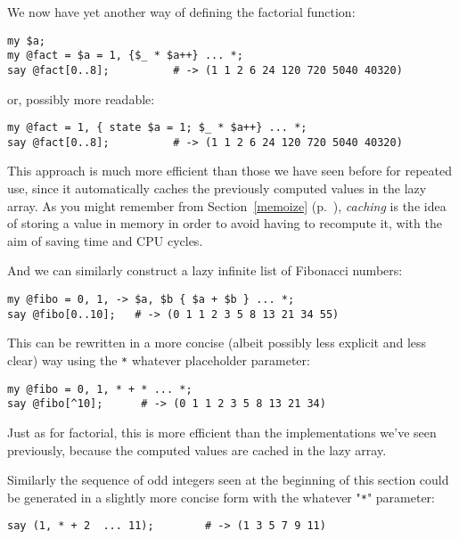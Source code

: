 We now have yet another way of defining the factorial 
function:

\begin{verbatim}
my $a;
my @fact = $a = 1, {$_ * $a++} ... *;
say @fact[0..8];          # -> (1 1 2 6 24 120 720 5040 40320)
\end{verbatim}

or, possibly more readable:

\begin{verbatim}
my @fact = 1, { state $a = 1; $_ * $a++} ... *;
say @fact[0..8];          # -> (1 1 2 6 24 120 720 5040 40320)
\end{verbatim}


This approach is much more efficient than those we have 
seen before for repeated use, since it automatically 
caches the previously computed values in the lazy array. 
As you might remember from Section~\ref{memoize} 
(p.~\pageref{memoize}), \emph{caching} is the idea of 
storing a value in memory in order to avoid having to 
recompute it, with the aim of saving time and CPU cycles.

And we can similarly construct a lazy infinite list of 
Fibonacci numbers:

\begin{verbatim}
my @fibo = 0, 1, -> $a, $b { $a + $b } ... *;
say @fibo[0..10];   # -> (0 1 1 2 3 5 8 13 21 34 55)
\end{verbatim}

This can be rewritten in a more concise (albeit possibly 
less explicit and less clear) way using the \verb'*' 
whatever placeholder parameter:

\begin{verbatim}
my @fibo = 0, 1, * + * ... *;
say @fibo[^10];      # -> (0 1 1 2 3 5 8 13 21 34)
\end{verbatim}

Just as for factorial, this is more efficient than the 
implementations we've seen previously, because the 
computed values are cached in the lazy array.

Similarly the sequence of odd integers seen at the 
beginning of this section could be generated in a 
slightly more concise form with the whatever "\verb'*'" 
parameter:

\begin{verbatim}
say (1, * + 2  ... 11);        # -> (1 3 5 7 9 11)
\end{verbatim}


